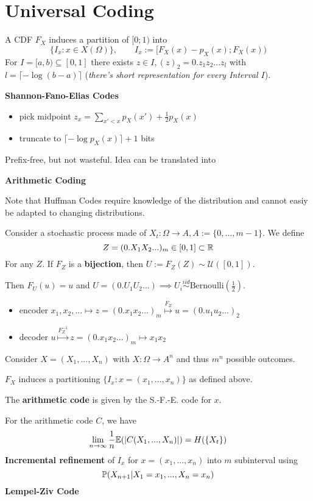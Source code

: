 \section{Universal Coding}

A CDF \(F_X\) induces a partition of \([0; 1)\) into 
\[\{I_x: x \in X(\Omega)\}, \qquad I_x := [F_X(x) - p_X(x); F_X(x))\]
For \(I = [a, b) \subseteq [0,1]\) there exists \(z \in I, (z)_2 = 0.z_1z_2...z_l\)
with \(l = \lceil - \log(b-a)\rceil\) (\textit{there's short representation for every Interval \(I\)}).

\textbf{Shannon-Fano-Elias Codes}
\begin{itemize}[label=-]
    \item pick midpoint \(z_x = \sum_{x' < x} p_X(x') + \frac{1}{2}p_X(x)\)
    \item truncate to \(\lceil - \log p_X(x) \rceil + 1\) bits
\end{itemize}
Prefix-free, but not wasteful. Idea can be translated into 

\textbf{Arithmetic Coding}

Note that Huffman Codes require knowledge of the distribution and cannot easiy be adapted to changing distributions.

Consider a stochastic process made of \(X_t: \Omega \to A, A := \{0, ..., m-1\}\). We define 
\[Z = (0.X_1X_2...)_m \in [0, 1] \subset \R\]
For any \(Z\). If \(F_Z\) is a \textbf{bijection}, then \(U := F_Z(Z) \sim \mathcal{U}([0,1])\).

Then \(F_U(u) = u\) and \(U = (0.U_1U_2...) \implies U_i \overset{iid}{\sim} \text{Bernoulli}\left(\frac{1}{2}\right)\).

\begin{itemize}[label=-]
    \item encoder \(x_1, x_2,... \mapsto z = (0.x_1x_2...)_m \overset{F_Z}{\mapsto} u = (0.u_1u_2...)_2\)
    \item decoder \(u \overset{F_Z^{-1}}{\mapsto} z = (0.x_1x_2...)_m \mapsto x_1x_2\)
\end{itemize}

Consider \(X =(X_1, ...,X_n)\) with \(X: \Omega \to A^n\) and thus \(m^n\) possible outcomes.

\(F_X\) induces a partitioning \(\{I_x: x = (x_1, ..., x_n)\}\) as defined above.

The \textbf{arithmetic code} is given by the S.-F.-E. code for \(x\).

For the arithmetic code \(C\), we have
\[\lim_{n \to \infty} \frac{1}{n}\E(|C(X_1, ..., X_n)|) = H(\{X_t\})\]
\textbf{Incremental refinement} of \(I_x\) for \(x=(x_1,...,x_n)\) into \(m\) subinterval using 
\[\P(X_{n+1} | X_1 = x_1, ..., X_n = x_n)\] 
\textbf{Lempel-Ziv Code}

